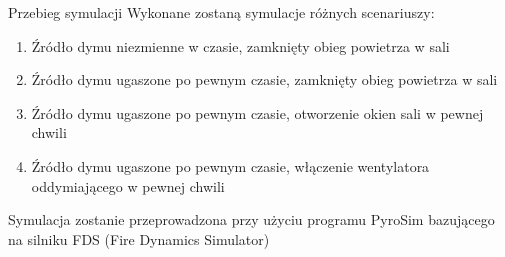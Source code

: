 \documentclass[a4paper, 12pt]{scrartcl}
\begin{document}
	\begin{section}{Przebieg symulacji}
		Wykonane zostaną symulacje różnych scenariuszy:
		\begin{enumerate}
			\item Źródło dymu niezmienne w czasie, zamknięty obieg powietrza w sali
			\item Źródło dymu ugaszone po pewnym czasie, zamknięty obieg powietrza w sali
			\item Źródło dymu ugaszone po pewnym czasie, otworzenie okien sali w pewnej chwili
			\item Źródło dymu ugaszone po pewnym czasie, włączenie wentylatora oddymiającego w pewnej chwili
		\end{enumerate}
		Symulacja zostanie przeprowadzona przy użyciu programu PyroSim bazującego na silniku FDS (Fire Dynamics Simulator)
	\end{section}
\end{document}
